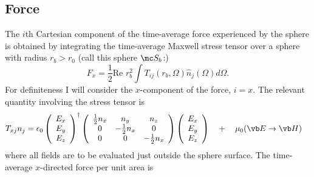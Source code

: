 \documentclass[letterpaper]{article}
\begin{document}
\subsection*{Force}

The $i$th Cartesian component of the time-average
force experienced by the sphere is obtained by integrating the 
time-average Maxwell stress tensor over a sphere with 
radius $r_b>r_0$ (call this sphere $\mc S_b$:)
\begin{equation}
F_x=\frac{1}{2}\text{Re }r_b^2 \int T_{ij}(r_b,\Omega) \hat{n}_j(\Omega) d\Omega.
\end{equation}
For definiteness I will consider the $x$-component of the force, $i=x$.
The relevant quantity involving the stress tensor is 
\begin{align*}
 T_{xj}n_j 
&=
\epsilon_0\left(\begin{array}{c} E_x \\ E_y \\ E_z \end{array}\right)^\dagger
          \left(\begin{array}{ccc} 
                 \frac{1}{2}n_x & n_y              & n_z \\
                 0              & -\frac{1}{2}n_x  & 0   \\ 
                 0              & 0                & -\frac{1}{2}n_x
                \end{array}
          \right)
          \left(\begin{array}{c} E_x \\ E_y \\ E_z \end{array}\right)
\quad+\quad \mu_0(\vb E \to \vb H)
\end{align*}
where all fields are to be evaluated just outside the sphere
surface.
The time-average $x$-directed force per unit area is 
\end{document}
